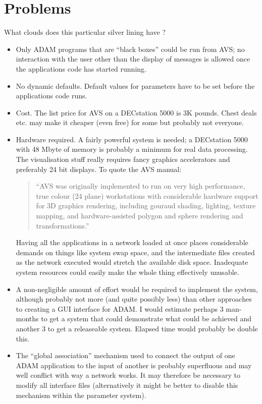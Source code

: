 \section{Problems}

What clouds does this particular silver lining have ?
\begin{itemize}

\item Only ADAM programs that are ``black boxes'' could be run from AVS; no
  interaction with the user other than the display of messages is allowed once
  the applications code has started running.

\item No dynamic defaults. Default values for parameters have to be set before
  the applications code runs.

\item Cost. The list price for AVS on a DECstation 5000 is 3K pounds. Chest deals
  etc. may make it cheaper (even free) for some but probably not everyone.

\item Hardware required. A fairly powerful system is needed; a DECstation 5000
  with 48 Mbyte of memory is probably a minimum for real data processing. The
  visualisation stuff really requires fancy graphics accelerators and
  preferably 24 bit displays. To quote the AVS manual:
\begin{quote}
	``AVS was originally implemented to run on very high performance,
	true colour (24 plane) workstations with considerable hardware
	support for 3D graphics rendering, including gouraud shading,
	lighting, texture mapping, and hardware-assisted polygon and
	sphere rendering and transformations.''
\end{quote}
  Having all the applications in a network loaded at once places
  considerable demands on things like system swap space, and the intermediate
  files created as the network executed would stretch the available disk space.
  Inadequate system resources could easily make the whole thing effectively
  unusable.

\item A non-negligible amount of effort would be required to implement the system,
  although probably not more (and quite possibly less) than other approaches to
  creating a GUI interface for ADAM. I would estimate perhaps 3 man-months to
  get a system that could demonstrate what could be achieved and another 3 to
  get a releaseable system. Elapsed time would probably be double this.

\item The ``global association'' mechanism used to connect the output of one ADAM
  application to the input of another is probably superfluous and may well
  conflict with way a network works. It may therefore be necessary to modify
  all interface files (alternatively it might be better to disable this
  mechanism within the parameter system).

\end{itemize}

